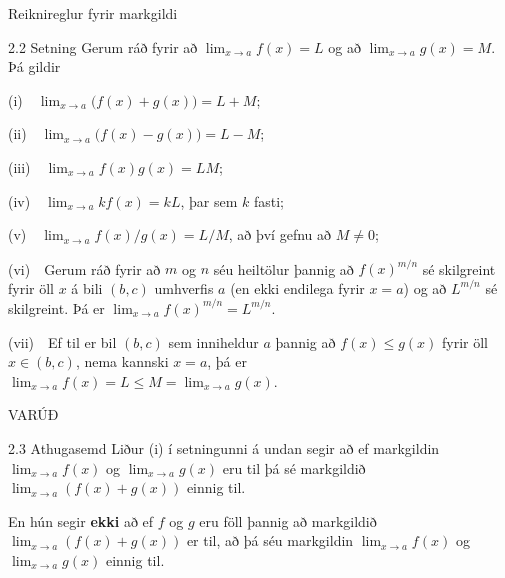 \documentclass[icelandic,a4paper,12pt]{article}
\begin{document}
\begin{frame}{Reiknireglur fyrir markgildi}
\pause
 \begin{block}{2.2 Setning}
   Gerum ráð fyrir að
$\lim_{x\rightarrow a}f(x)=L$ og að   $\lim_{x\rightarrow a}g(x)=M$.
Þá gildir

\pause

(i)\ \ $\lim_{x\rightarrow a}\Big(f(x)+g(x)\Big)=L+M$;

(ii)\  \ $\lim_{x\rightarrow a}\Big(f(x)-g(x)\Big)=L-M$;

\pause

(iii)\ \  $\lim_{x\rightarrow a}f(x)g(x)=LM$;

(iv)\ \  $\lim_{x\rightarrow a}kf(x)=kL$, þar sem $k$ fasti;

(v)\ \  $\lim_{x\rightarrow a}f(x)/g(x)=L/M$, að því gefnu að $M\neq 0$;

\pause

(vi)\ \ Gerum ráð fyrir að $m$ og $n$ séu 
heiltölur þannig að $f(x)^{m/n}$ sé
  skilgreint fyrir öll $x$ á bili $(b,c)$ umhverfis $a$ (en ekki
  endilega fyrir $x=a$) og að $L^{m/n}$ sé skilgreint.
Þá er $\lim_{x\rightarrow a}f(x)^{m/n}=L^{m/n}$.

\pause

(vii)\ \   Ef til er bil $(b,c)$ sem inniheldur $a$ þannig að 
$f(x)\leq g(x)$ fyrir öll $x\in (b,c)$, nema kannski $x=a$, þá er
 $\lim_{x\rightarrow a}f(x)=L\leq M=\lim_{x\rightarrow a}g(x)$.

 \end{block}
\end{frame}

\begin{frame}{VARÚÐ}
\begin{block}{2.3 Athugasemd}
	Liður (i) í setningunni á undan segir að ef markgildin
	$\lim_{x\to a} f(x)$ og $\lim_{x\to a} g(x)$ eru til þá
	sé markgildið
	$\lim_{x\to a} (f(x)+g(x))$ einnig til.

\bigskip\pause

	En hún segir {\bf ekki} að ef 
	$f$ og $g$ eru föll þannig að markgildið
	$\lim_{x\to a} (f(x)+g(x))$ er til, að þá séu markgildin
	$\lim_{x\to a} f(x)$ og $\lim_{x\to a} g(x)$ einnig til.
\end{block}
\end{frame}
\end{document}
